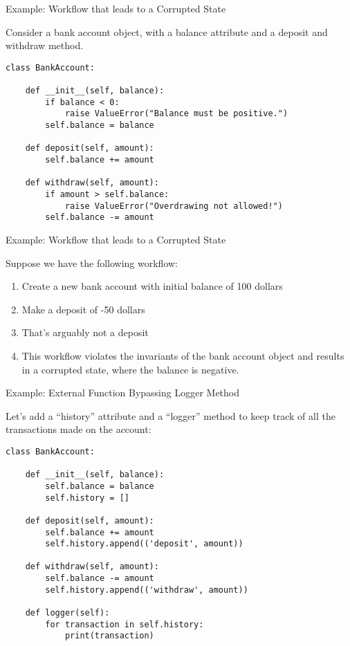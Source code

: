 \documentclass[handout]{beamer}
\begin{document}
\begin{frame}[fragile]{Example: Workflow that leads to a Corrupted State}
    
    Consider a bank account object, with a balance attribute and a deposit and withdraw method.
    
    \begin{lstlisting}[style=python]
class BankAccount:
    
    def __init__(self, balance):
        if balance < 0:
            raise ValueError("Balance must be positive.")
        self.balance = balance
    
    def deposit(self, amount):
        self.balance += amount
        
    def withdraw(self, amount):
        if amount > self.balance:
            raise ValueError("Overdrawing not allowed!")
        self.balance -= amount
    \end{lstlisting}
    
\end{frame}


\begin{frame}[fragile]{Example: Workflow that leads to a Corrupted State}
        
    Suppose we have the following workflow:
    
    \begin{enumerate}
        \item Create a new bank account with initial balance of 100 dollars
        \item Make a deposit of -50 dollars
        \item That's arguably not a deposit
        \item This workflow violates the invariants of the bank account object and results in a corrupted state, where the balance is negative.
    \end{enumerate}
    
\end{frame}


\begin{frame}[fragile]{Example: External Function Bypassing Logger Method}
    
    Let's add a ``history'' attribute and a ``logger'' method to keep track of all the transactions made on the account:
    
    \begin{lstlisting}[style=python]
class BankAccount:
    
    def __init__(self, balance):
        self.balance = balance
        self.history = []
    
    def deposit(self, amount):
        self.balance += amount
        self.history.append(('deposit', amount))
    
    def withdraw(self, amount):
        self.balance -= amount
        self.history.append(('withdraw', amount))
        
    def logger(self):
        for transaction in self.history:
            print(transaction)
    \end{lstlisting}
    
\end{frame}
\end{document}
